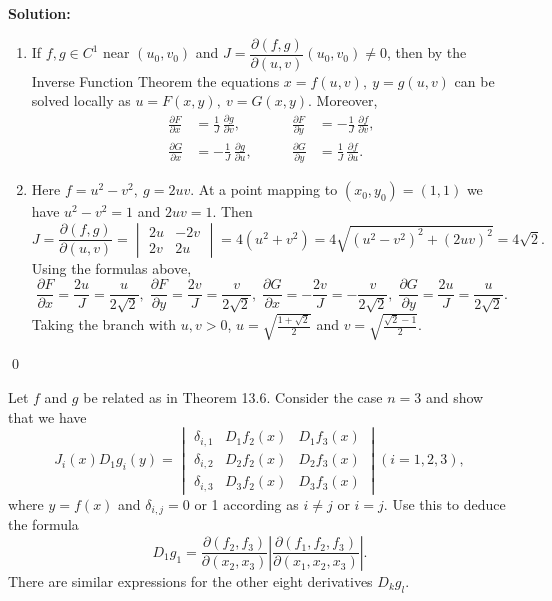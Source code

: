 \noindent\textbf{Solution:}
\begin{enumerate}[label=(\alph*)]
    \item If $f,g\in C^1$ near $(u_0,v_0)$ and $J=\dfrac{\partial(f,g)}{\partial(u,v)}(u_0,v_0)\neq 0$, then by the Inverse Function Theorem the equations $x=f(u,v),\ y=g(u,v)$ can be solved locally as $u=F(x,y),\ v=G(x,y)$. Moreover,
    \[
    \begin{aligned}
    \frac{\partial F}{\partial x}&=\frac{1}{J}\,\frac{\partial g}{\partial v},&\qquad \frac{\partial F}{\partial y}&=-\frac{1}{J}\,\frac{\partial f}{\partial v},\\
    \frac{\partial G}{\partial x}&=-\frac{1}{J}\,\frac{\partial g}{\partial u},&\qquad \frac{\partial G}{\partial y}&=\frac{1}{J}\,\frac{\partial f}{\partial u}.
    \end{aligned}
    \]
    \item Here $f=u^2-v^2,\ g=2uv$. At a point mapping to $(x_0,y_0)=(1,1)$ we have $u^2-v^2=1$ and $2uv=1$. Then
    \[J=\frac{\partial(f,g)}{\partial(u,v)}=\begin{vmatrix}2u&-2v\\2v&2u\end{vmatrix}=4(u^2+v^2)=4\sqrt{(u^2-v^2)^2+(2uv)^2}=4\sqrt{2}.
    \]
    Using the formulas above,
    \[\frac{\partial F}{\partial x}=\frac{2u}{J}=\frac{u}{2\sqrt2},\;\frac{\partial F}{\partial y}=\frac{2v}{J}=\frac{v}{2\sqrt2},\;\frac{\partial G}{\partial x}=-\frac{2v}{J}=-\frac{v}{2\sqrt2},\;\frac{\partial G}{\partial y}=\frac{2u}{J}=\frac{u}{2\sqrt2}.
    \]
    Taking the branch with $u,v>0$, $u=\sqrt{\tfrac{1+\sqrt2}{2}}$ and $v=\sqrt{\tfrac{\sqrt2-1}{2}}$.
\end{enumerate}\qed


\begin{problembox}
Let \( f \) and \( g \) be related as in Theorem 13.6. Consider the case \( n = 3 \) and show that we have
\[J_i(x)D_1g_i(y) =
\begin{vmatrix}
\delta_{i,1} & D_1f_2(x) & D_1f_3(x)\\
\delta_{i,2} & D_2f_2(x) & D_2f_3(x)\\
\delta_{i,3} & D_3f_2(x) & D_3f_3(x)
\end{vmatrix}
(i = 1, 2, 3),\]
where \( y = f(x) \) and \( \delta_{i,j} = 0 \) or 1 according as \( i \neq j \) or \( i = j \). Use this to deduce the formula
\[D_1g_1 = \frac{\partial (f_2, f_3)}{\partial (x_2, x_3)} \left| \frac{\partial (f_1, f_2, f_3)}{\partial (x_1, x_2, x_3)} \right|.\]
There are similar expressions for the other eight derivatives \( D_kg_l \).
\end{problembox}

